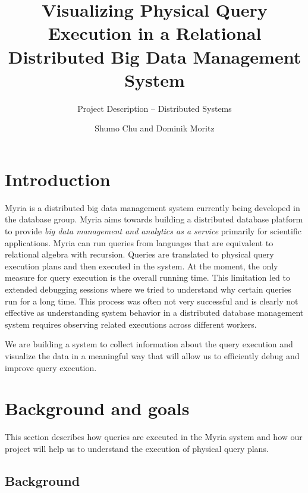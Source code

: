 \documentclass[11pt]{scrartcl}
\begin{document}

\title{Visualizing Physical Query Execution in a Relational Distributed Big Data Management System}
\subtitle{Project Description \--- Distributed Systems}
\author{Shumo Chu and Dominik Moritz}
\date{}

\maketitle

\section{Introduction}

Myria is a distributed big data management system currently being developed in the database group. Myria aims towards building a distributed database platform to provide \emph{big data management and analytics as a service} primarily for scientific applications. Myria can run queries from languages that are equivalent to relational algebra with recursion. Queries are translated to physical query execution plans and then executed in the system. At the moment, the only measure for query execution is the overall running time. This limitation led to extended debugging sessions where we tried to understand why certain queries run for a long time. This process was often not very successful and is clearly not effective as understanding system behavior in a distributed database management system requires observing related executions across different workers.

We are building a system to collect information about the query execution and visualize the data in a meaningful way that will allow us to efficiently debug and improve query execution.


\section{Background and goals}

This section describes how queries are executed in the Myria system and how our project will help us to understand the execution of physical query plans.


\subsection{Background}
\label{sec:background}
\end{document}
